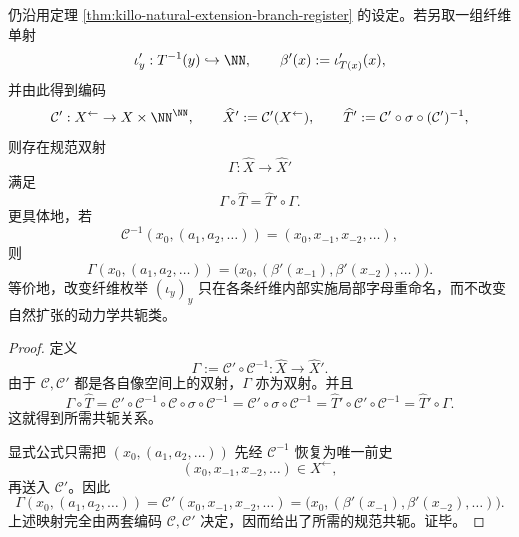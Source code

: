 \begin{theorem}[分支指标寄存器编码的规范共轭不变性]\label{thm:xi-branch-register-coding-conjugacy-invariance}
仍沿用定理 \ref{thm:killo-natural-extension-branch-register} 的设定。若另取一组纤维单射
\[
\iota_y':T^{-1}(y)\hookrightarrow \NN,
\qquad
\beta'(x):=\iota'_{T(x)}(x),
\]
并由此得到编码
\[
\mathcal C':X^{\leftarrow}\to X\times\NN^\NN,
\qquad
\widehat X':=\mathcal C'(X^{\leftarrow}),
\qquad
\widehat T':=\mathcal C'\circ \sigma\circ (\mathcal C')^{-1},
\]
则存在规范双射
\[
\Gamma:\widehat X\to \widehat X'
\]
满足
\[
\Gamma\circ \widehat T=\widehat T'\circ \Gamma.
\]
更具体地，若
\[
\mathcal C^{-1}(x_0,(a_1,a_2,\dots))=(x_0,x_{-1},x_{-2},\dots),
\]
则
\[
\Gamma(x_0,(a_1,a_2,\dots))
=
\bigl(x_0,(\beta'(x_{-1}),\beta'(x_{-2}),\dots)\bigr).
\]
等价地，改变纤维枚举 \((\iota_y)_y\) 只在各条纤维内部实施局部字母重命名，而不改变自然扩张的动力学共轭类。
\end{theorem}
\begin{proof}
定义
\[
\Gamma:=\mathcal C'\circ \mathcal C^{-1}:\widehat X\to \widehat X'.
\]
由于 \(\mathcal C,\mathcal C'\) 都是各自像空间上的双射，\(\Gamma\) 亦为双射。并且
\[
\Gamma\circ \widehat T
=
\mathcal C'\circ \mathcal C^{-1}\circ \mathcal C\circ \sigma\circ \mathcal C^{-1}
=
\mathcal C'\circ \sigma\circ \mathcal C^{-1}
=
\widehat T'\circ \mathcal C'\circ \mathcal C^{-1}
=
\widehat T'\circ \Gamma.
\]
这就得到所需共轭关系。

显式公式只需把 \((x_0,(a_1,a_2,\dots))\) 先经 \(\mathcal C^{-1}\) 恢复为唯一前史
\[
(x_0,x_{-1},x_{-2},\dots)\in X^{\leftarrow},
\]
再送入 \(\mathcal C'\)。因此
\[
\Gamma(x_0,(a_1,a_2,\dots))
=
\mathcal C'(x_0,x_{-1},x_{-2},\dots)
=
\bigl(x_0,(\beta'(x_{-1}),\beta'(x_{-2}),\dots)\bigr).
\]
上述映射完全由两套编码 \(\mathcal C,\mathcal C'\) 决定，因而给出了所需的规范共轭。证毕。
\end{proof}

